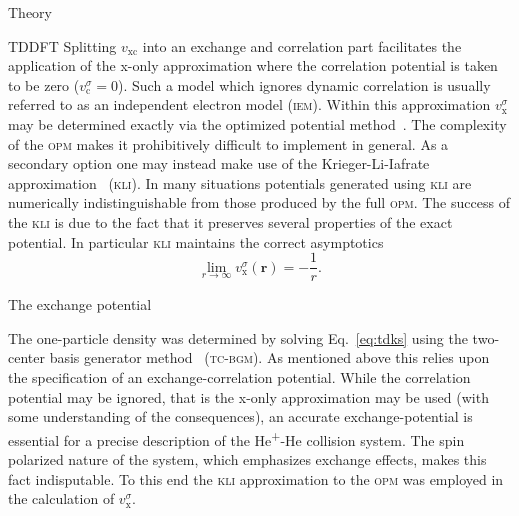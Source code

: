 \documentclass[aps, pra, reprint, groupedaddress, amsfonts,
               amsmath, amssymb, showpacs, nofootinbib]{revtex4-1}
\begin{document}
\begin{section}{Theory \label{sec:theory}}
\begin{subsection}{TDDFT \label{sec:tddft}}
      Splitting $v_\mathrm{xc}$ into an exchange and correlation part facilitates the application of the
      x-only approximation where the correlation potential is taken to be zero ($v^\sigma_\mathrm{c} =
      0$). Such a model which ignores dynamic correlation is usually referred to as an independent
      electron model (\textsc{iem}). Within this approximation $v^\sigma_\mathrm{x}$ may be determined
      exactly via the optimized potential method~\cite{opm1, opm2, tdopm}. The complexity of the
      \textsc{opm} makes it prohibitively difficult to implement in general. As a secondary
      option one may instead make use of the Krieger-Li-Iafrate approximation~\cite{klieq, tdkli1,
      tdkli2} (\textsc{kli}). In many situations potentials generated using \textsc{kli} are numerically
      indistinguishable from those produced by the full \textsc{opm}. The success of the \textsc{kli} is
      due to the fact that it preserves several properties of the exact potential. In particular
      \textsc{kli} maintains the correct asymptotics
      \begin{equation} \label{eq:asymp}
         \lim\limits_{r \rightarrow \infty} v_\mathrm{x}^\sigma (\mathbf{r}) = -\frac{1}{r}.
      \end{equation}
   
   \end{subsection}

   \begin{subsection}{The exchange potential \label{sec:xpot}}

      The one-particle density was determined by solving Eq.~\eqref{eq:tdks} using the two-center basis
      generator method~\cite{tcbgm} (\textsc{tc-bgm}). As mentioned above this relies upon the
      specification of an exchange-correlation potential. While the correlation potential may be
      ignored, that is the x-only approximation may be used (with some understanding of the
      consequences), an accurate exchange-potential is essential for a precise description of the
      He\textsuperscript{+}-He collision system. The spin polarized nature of the system, which
      emphasizes exchange effects, makes this fact indisputable. To this end the \textsc{kli}
      approximation to the \textsc{opm} was employed in the calculation of $v^\sigma_\mathrm{x}$.


\end{subsection}
\end{section}
\end{document}
